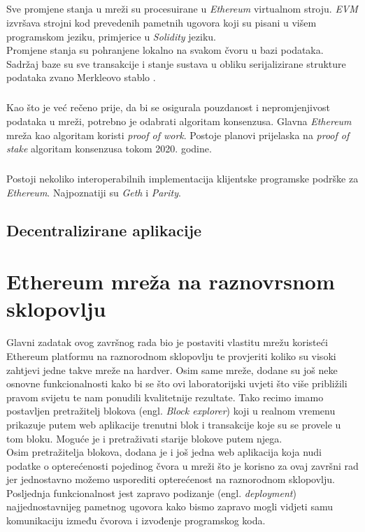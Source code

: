 \documentclass[times, utf8, zavrsni, numeric]{fer}
\begin{document}
\paragraph{}
Sve promjene stanja u mreži su procesuirane u \emph{Ethereum} virtualnom stroju. \emph{EVM} izvršava strojni kod prevedenih pametnih ugovora koji su pisani u višem
programskom jeziku, primjerice u \emph{Solidity} jeziku. \\
Promjene stanja su pohranjene lokalno na svakom čvoru u bazi podataka. Sadržaj baze su sve transakcije i stanje sustava u obliku serijalizirane strukture podataka zvano
Merkleovo stablo .
\paragraph{}
Kao što je već rečeno prije, da bi se osigurala pouzdanost i nepromjenjivost podataka u mreži, potrebno je odabrati algoritam konsenzusa. Glavna \emph{Ethereum} mreža
kao algoritam koristi \emph{proof of work}. Postoje planovi prijelaska na \emph{proof of stake} algoritam konsenzusa tokom 2020. godine.
\paragraph{}
Postoji nekoliko interoperabilnih implementacija klijentske programske podrške za \emph{Ethereum}. Najpoznatiji su \emph{Geth} i \emph{Parity}.\citep{masteringEth}


\section{Decentralizirane aplikacije }



\chapter{Ethereum mreža na raznovrsnom sklopovlju}
Glavni zadatak ovog završnog rada bio je postaviti vlastitu mrežu koristeći Ethereum platformu na raznorodnom sklopovlju
te provjeriti koliko su visoki zahtjevi jedne takve mreže na hardver. Osim same mreže, dodane su još neke osnovne funkcionalnosti
kako bi se što ovi laboratorijski uvjeti što više približili pravom svijetu te nam ponudili kvalitetnije rezultate. Tako recimo
imamo postavljen pretražitelj blokova (engl. \emph{Block explorer}) koji u realnom vremenu prikazuje putem web aplikacije
trenutni blok i transakcije koje su se provele u tom bloku. Moguće je i pretraživati starije blokove putem njega. \\
Osim pretražitelja blokova, dodana je i još jedna web aplikacija koja nudi podatke o opterećenosti pojedinog čvora u mreži
što je korisno za ovaj završni rad jer jednostavno možemo usporediti opterećenost na raznorodnom sklopovlju. \\
Posljednja funkcionalnost jest zapravo podizanje (engl. \emph{deployment}) najjednostavnijeg pametnog ugovora kako bismo
zapravo mogli vidjeti samu komunikaciju između čvorova i izvođenje programskog koda.
\end{document}
